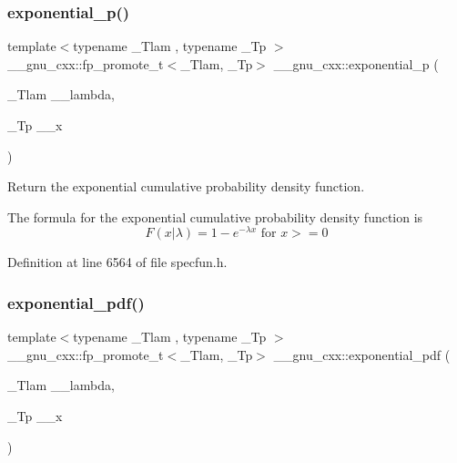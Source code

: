 \subsubsection{\texorpdfstring{exponential\+\_\+p()}{exponential\_p()}}
{\footnotesize\ttfamily template$<$typename \+\_\+\+Tlam , typename \+\_\+\+Tp $>$ \\
\+\_\+\+\_\+gnu\+\_\+cxx\+::fp\+\_\+promote\+\_\+t$<$\+\_\+\+Tlam, \+\_\+\+Tp$>$ \+\_\+\+\_\+gnu\+\_\+cxx\+::exponential\+\_\+p (\begin{DoxyParamCaption}\item[{\+\_\+\+Tlam}]{\+\_\+\+\_\+lambda,  }\item[{\+\_\+\+Tp}]{\+\_\+\+\_\+x }\end{DoxyParamCaption})\hspace{0.3cm}{\ttfamily [inline]}}



Return the exponential cumulative probability density function. 

The formula for the exponential cumulative probability density function is \[ F(x|\lambda) = 1 - e^{-\lambda x} \mbox{ for } x >= 0 \] 

Definition at line 6564 of file specfun.\+h.

\mbox{\label{group__gnu__math__spec__func_ga7f35499a94fd8930810809988332161e}} 
\subsubsection{\texorpdfstring{exponential\+\_\+pdf()}{exponential\_pdf()}}
{\footnotesize\ttfamily template$<$typename \+\_\+\+Tlam , typename \+\_\+\+Tp $>$ \\
\+\_\+\+\_\+gnu\+\_\+cxx\+::fp\+\_\+promote\+\_\+t$<$\+\_\+\+Tlam, \+\_\+\+Tp$>$ \+\_\+\+\_\+gnu\+\_\+cxx\+::exponential\+\_\+pdf (\begin{DoxyParamCaption}\item[{\+\_\+\+Tlam}]{\+\_\+\+\_\+lambda,  }\item[{\+\_\+\+Tp}]{\+\_\+\+\_\+x }\end{DoxyParamCaption})\hspace{0.3cm}{\ttfamily [inline]}}



